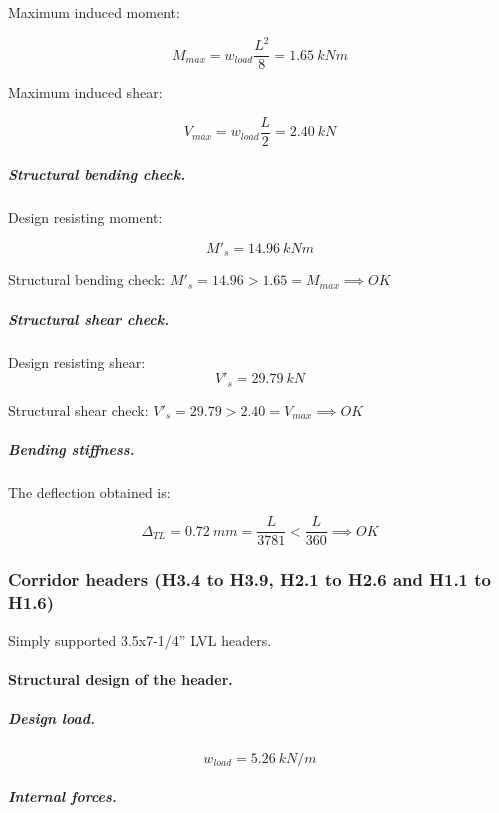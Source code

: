 \noindent Maximum induced moment:

\begin{equation}
  M_{max}= w_{load} \frac{L^2}{8}= 1.65\ kN m
\end{equation}

\noindent Maximum induced shear:

\begin{equation}
  V_{max}= w_{load} \frac{L}{2}= 2.40\ kN
\end{equation}

\subparagraph{Structural bending check.}

\noindent Design resisting moment:

\begin{equation}
  M'_s= 14.96\ kN m
\end{equation}

\noindent Structural bending check: $M'_s = 14.96 > 1.65 = M_{max} \implies OK$

\subparagraph{Structural shear check.}

\noindent Design resisting shear:
\begin{equation}
  V'_s= 29.79\ kN
\end{equation}

\noindent Structural shear check: $V'_s = 29.79 > 2.40 = V_{max} \implies OK$

\subparagraph{Bending stiffness.}
The deflection obtained is:

\begin{equation}
  \Delta_{TL}= 0.72\ mm= \frac{L}{3781} < \frac{L}{360} \implies OK
\end{equation}

\subsubsection{Corridor headers (H3.4 to H3.9, H2.1 to H2.6 and H1.1 to H1.6)}
Simply supported 3.5x7-1/4'' LVL headers.

\paragraph{Structural design of the header.}

\subparagraph{Design load.}

\begin{equation}
  w_{load}= 5.26\ kN/m
\end{equation}

\subparagraph{Internal forces.}

